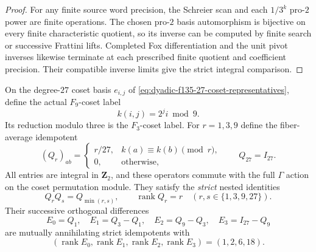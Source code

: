 \begin{proof}
For any finite
source word
precision, the
Schreier scan
and each
$1/3^k$ pro-$2$
power are finite
operations.
The chosen
pro-$2$ basis
automorphism is
bijective on
every finite
characteristic
quotient, so
its inverse
can be computed
by finite search
or successive
Frattini lifts.
Completed Fox
differentiation
and the unit
pivot inverses
likewise terminate
at each prescribed
finite quotient
and coefficient
precision.
Their compatible
inverse limits
give the strict
integral comparison.
\end{proof}

\begin{theorem}
\label{thm:dyadic-f135-four-heeke-projectors}
On the degree-$27$
coset basis $e_{i,j}$
of
\eqref{eq:dyadic-f135-27-coset-representatives},
define the actual
$F_9$-coset label
\begin{equation}\label{eq:dyadic-f135-27-to-9-label}
\boxed{\qquad
k(i,j)=2^j i\bmod9.
\qquad}
\end{equation}
Its reduction modulo
three is the
$F_3$-coset label.
For $r=1,3,9$
define the
fiber-average
idempotent
\begin{equation}\label{eq:dyadic-f135-four-fiber-averages}
\boxed{
(Q_r)_{ab}
=
\begin{cases}
r/27,
&k(a)\equiv k(b)\pmod r,\\
0,&\text{otherwise},
\end{cases}
\qquad Q_{27}=I_{27}.
}
\end{equation}
All entries are
integral in
$\mathbf Z_2$,
and these
operators commute
with the full
$\Gamma$ action
on the coset
permutation module.
They satisfy
the \emph{strict}
nested identities
\begin{equation}\label{eq:dyadic-f135-nested-average-relations}
\boxed{\qquad
Q_rQ_s=Q_{\min(r,s)},
\qquad
\operatorname{rank}Q_r=r
\quad(r,s\in\{1,3,9,27\}).
\qquad}
\end{equation}
Their successive
orthogonal differences
\begin{equation}\label{eq:dyadic-f135-four-orthogonal-layers}
\boxed{
E_0=Q_1,\quad
E_1=Q_3-Q_1,\quad
E_2=Q_9-Q_3,\quad
E_3=I_{27}-Q_9
}
\end{equation}
are mutually
annihilating
strict idempotents
with
\begin{equation}\label{eq:dyadic-f135-primitive-layer-ranks}
\boxed{\quad
(\operatorname{rank}E_0,
\operatorname{rank}E_1,
\operatorname{rank}E_2,
\operatorname{rank}E_3)
=(1,2,6,18).
\quad}
\end{equation}


\end{theorem}
